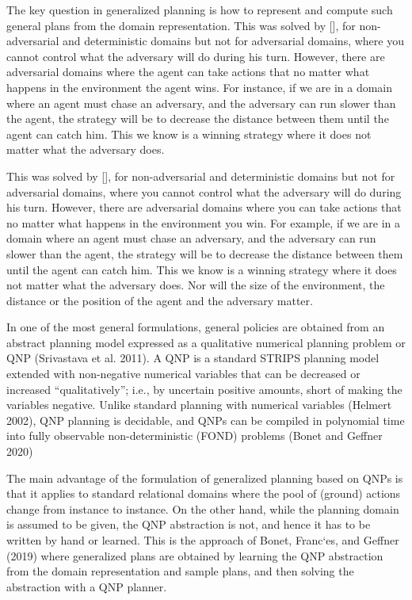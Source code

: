 \documentclass[a4paper]{article}
\begin{document}
The key question in generalized planning is how to represent and compute such general plans from the domain representation. This was solved by [], for non-adversarial and deterministic domains but not for adversarial domains, where you cannot control what the adversary will do during his turn. However, there are adversarial domains where the agent can take actions that no matter what happens in the environment the agent wins. For instance, if we are in a domain where an agent must chase an adversary, and the adversary can run slower than the agent, the strategy will be to decrease the distance between them until the agent can catch him. This we know is a winning strategy where it does not matter what the adversary does.

This was solved by [], for non-adversarial and deterministic domains but not for adversarial domains, where you cannot control what the adversary will do during his turn. However, there are adversarial domains where you can take actions that no matter what happens in the environment you win. For example, if we are in a domain where an agent must chase an adversary, and the adversary can run slower than the agent, the strategy will be to decrease the distance between them until the agent can catch him. This we know is a winning strategy where it does not matter what the adversary does. Nor will the size of the environment, the distance or the position of the agent and the adversary matter.

In one of the most general formulations, general policies are obtained from an abstract planning model expressed as a qualitative numerical planning problem or QNP (Srivastava et al. 2011). A QNP is a standard STRIPS planning model extended with non-negative numerical variables that can be decreased or increased “qualitatively”; i.e., by uncertain positive amounts, short of making the variables negative. Unlike standard planning with numerical variables (Helmert 2002), QNP planning is decidable, and QNPs can be compiled in polynomial time into fully observable non-deterministic (FOND) problems (Bonet and Geffner 2020)

The main advantage of the formulation of generalized planning based on QNPs is that it applies to standard relational domains where the pool of (ground) actions change from instance to instance. On the other hand, while the planning domain is assumed to be given, the QNP abstraction is not, and hence it has to be written by hand or learned. This is the approach of Bonet, Franc`es, and Geffner (2019) where generalized plans are obtained by learning the QNP abstraction from the domain representation and sample plans, and then solving the abstraction with a QNP planner.
\end{document}
